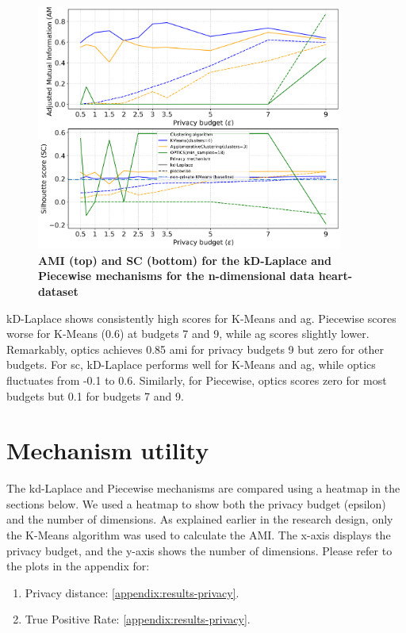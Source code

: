 \newpage
\begin{figure}[H]
  \centering

  \caption{\textbf{AMI (top) and SC (bottom) for the kD-Laplace and Piecewise mechanisms for the n-dimensional data heart-dataset}}
  \includegraphics[width=0.9\textwidth]{Results/kd-laplace/kd-Laplace/heart-dataset/ami-and-sc_9_dimensions.png}

  \label{fig:validation-heart-dataset_comparison_nd-laplace}
\end{figure}
kD-Laplace shows consistently high scores for K-Means and \gls{ag}.
Piecewise scores worse for K-Means (0.6) at budgets 7 and 9, while \gls{ag} scores slightly lower.
Remarkably, \gls{optics} achieves 0.85 \gls{ami} for privacy budgets 9 but zero for other budgets. For \gls{sc}, kD-Laplace performs well for K-Means and \gls{ag}, while \gls{optics} fluctuates from -0.1 to 0.6.
Similarly, for Piecewise, \gls{optics} scores zero for most budgets but 0.1 for budgets 7 and 9.

\newpage
\section{Mechanism utility}
The kd-Laplace and Piecewise mechanisms are compared using a heatmap in the sections below.
We used a heatmap to show both the privacy budget (epsilon) and the number of dimensions.
As explained earlier in the research design, only the K-Means algorithm was used to calculate the AMI.
The x-axis displays the privacy budget, and the y-axis shows the number of dimensions. \newline
Please refer to the plots in the appendix for:
\begin{enumerate}
  \item Privacy distance: \ref{appendix:results-privacy}.
  \item True Positive Rate: \ref{appendix:results-privacy}.
\end{enumerate}
\newpage
